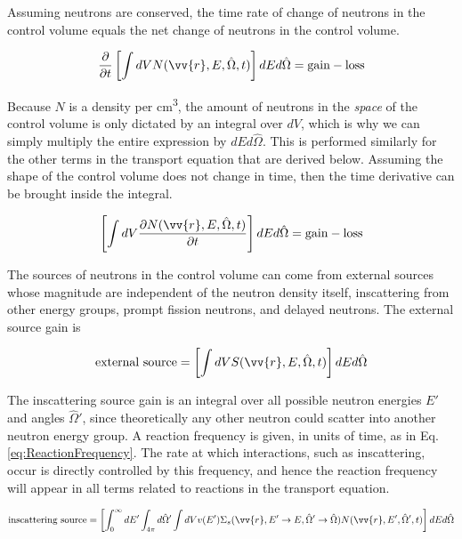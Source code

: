 \documentclass[10pt]{article}
\begin{document}
\begin{flushleft}
Assuming neutrons are conserved, the time rate of change of neutrons in the control volume equals the net change of neutrons in the control volume. 

\begin{equation}
\label{eq:Conservation1}
\frac{\partial}{\partial t} \left\lbrack\int dV N(\vv{r}, E, \hat{\Omega},t)\right\rbrack dEd\hat{\Omega} = \textrm{gain} - \textrm{loss}
\end{equation}

Because \(N\) is a density per cm\textsuperscript{3}, the amount of neutrons in the \textit{space} of the control volume is only dictated by an integral over \(dV\), which is why we can simply multiply the entire expression by \(dEd\hat{\Omega}\). This is performed similarly for the other terms in the transport equation that are derived below. Assuming the shape of the control volume does not change in time, then the time derivative can be brought inside the integral.

\begin{equation}
\label{eq:Conservation2}
\left\lbrack\int dV \frac{\partial N(\vv{r}, E, \hat{\Omega},t) }{\partial t}\right\rbrack dEd\hat{\Omega} = \textrm{gain} - \textrm{loss}
\end{equation}

The sources of neutrons in the control volume can come from external sources whose magnitude are independent of the neutron density itself, inscattering from other energy groups, prompt fission neutrons, and delayed neutrons. The external source gain is

\begin{equation}
\label{eq:ConservationExternalSource}
\textrm{external source} = \left\lbrack\int dV S(\vv{r}, E, \hat{\Omega},t)\right\rbrack dEd\hat{\Omega}
\end{equation}

The inscattering source gain is an integral over all possible neutron energies \(E'\) and angles \(\hat{\Omega}'\), since theoretically any other neutron could scatter into another neutron energy group. A reaction frequency is given, in units of time, as in Eq. \ref{eq:ReactionFrequency}. The rate at which interactions, such as inscattering, occur is directly controlled by this frequency, and hence the reaction frequency will appear in all terms related to reactions in the transport equation.

\begin{equation}
\label{eq:ConservationInscatteringSource}
\textrm{inscattering source} = \left\lbrack\int_{0}^{\infty} dE'\int_{4\pi}^{} d\hat{\Omega}'\int dV v(E')\Sigma_s(\vv{r},E'\rightarrow E, \hat{\Omega}'\rightarrow\hat{\Omega}) N(\vv{r}, E', \hat{\Omega}',t)\right\rbrack dEd\hat{\Omega}
\end{equation}


\end{flushleft}
\end{document}
